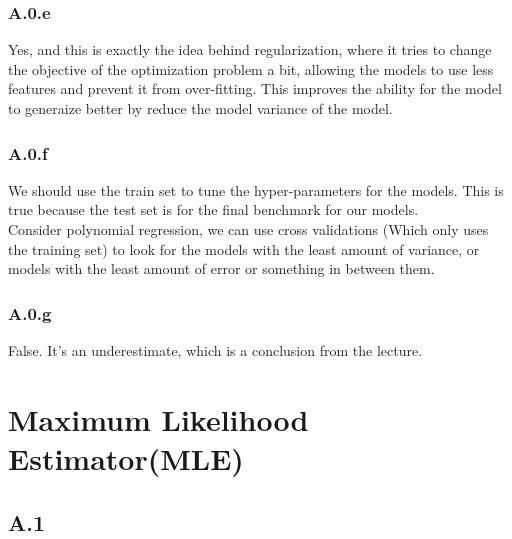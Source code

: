 \documentclass[]{article}
\begin{document}
        \subsubsection*{A.0.e}
            Yes, and this is exactly the idea behind regularization, where it tries to change the objective of the optimization problem a bit, allowing the models to use less features and prevent it from over-fitting. This improves the ability for the model to generaize better by reduce the model variance of the model. 
        \subsubsection*{A.0.f}
            We should use the train set to tune the hyper-parameters for the models. This is true because the test set is for the final benchmark for our models. 
            \\
            Consider polynomial regression, we can use cross validations (Which only uses the training set) to look for the models with the least amount of variance, or models with the least amount of error or something in between them. 
        \subsubsection*{A.0.g}
            False. It's an underestimate, which is a conclusion from the lecture.

\section*{Maximum Likelihood Estimator(MLE)}
    \subsection*{A.1}
\end{document}
